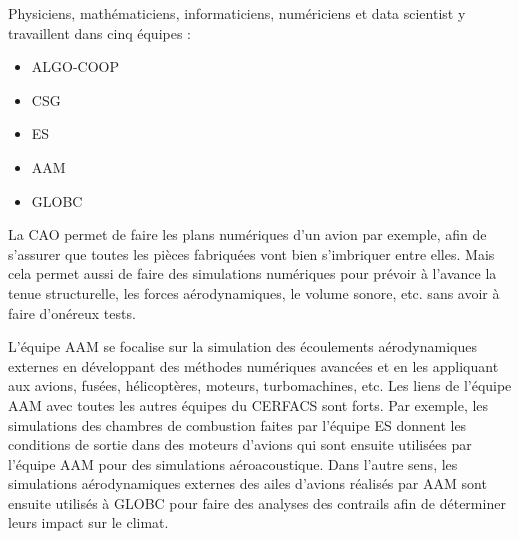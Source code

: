 
Physiciens, mathématiciens, informaticiens, numériciens et data scientist y travaillent dans cinq équipes :


\begin{itemize}
    \item \ac{ALGO-COOP}
    \item \ac{CSG}
    \item \ac{ES}
    \item \ac{AAM}
    \item \ac{GLOBC}
\end{itemize}

\hspace{0,5cm}



La \ac{CAO} permet de faire les plans numériques d'un avion par exemple, afin de s'assurer que toutes les pièces fabriquées vont bien s'imbriquer entre elles. Mais cela permet aussi de faire des simulations numériques pour prévoir à l'avance la tenue structurelle, les forces aérodynamiques, le volume sonore, etc. sans avoir à faire d'onéreux tests.

L'équipe AAM se focalise sur la simulation des écoulements aérodynamiques externes en développant des méthodes numériques avancées et en les appliquant aux avions, fusées, hélicoptères, moteurs, turbomachines, etc.
Les liens de l’équipe AAM avec toutes les autres équipes du CERFACS sont forts.
Par exemple, les simulations des chambres de combustion faites par l'équipe ES donnent les conditions de sortie dans des moteurs d'avions qui sont ensuite utilisées par l'équipe AAM pour des simulations aéroacoustique.
Dans l'autre sens, les simulations aérodynamiques externes des ailes d'avions réalisés par AAM sont ensuite utilisés à GLOBC pour faire des analyses des contrails afin de déterminer leurs impact sur le climat.


\hspace{0,5cm}

